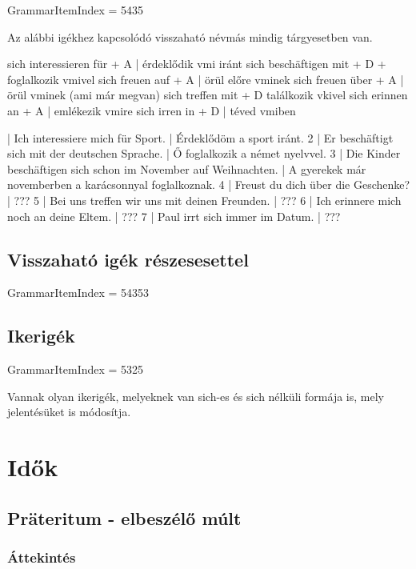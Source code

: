 \documentclass{article}
\newenvironment{desc}{\verbatim}{\endverbatim}
\newenvironment{exmp}{\verbatim}{\endverbatim}
\begin{document}
GrammarItemIndex = 5435

\begin{desc}
Az alábbi igékhez kapcsolódó visszaható névmás mindig tárgyesetben van.

sich interessieren für + A | érdeklődik vmi iránt
sich beschäftigen mit + D + foglalkozik vmivel
sich freuen auf + A | örül előre vminek
sich freuen über + A | örül vminek (ami már megvan)
sich treffen mit + D  találkozik vkivel
sich erinnen an + A | emlékezik vmire
sich irren in + D | téved vmiben
\end{desc}

\begin{exmp}
1 | Ich interessiere mich für Sport. | Érdeklődöm a sport iránt.
2 | Er beschäftigt sich mit der deutschen Sprache. | Ő foglalkozik a német nyelvvel.
3 | Die Kinder beschäftigen sich schon im November auf Weihnachten. | A gyerekek már novemberben a karácsonnyal foglalkoznak.
4 | Freust du dich über die Geschenke? | ???
5 | Bei uns treffen wir uns mit deinen Freunden. | ???
6 | Ich erinnere mich noch an deine Eltem. | ???
7 | Paul irrt sich immer im Datum. | ???
\end{exmp}

\subsection{Visszaható igék részesesettel}

GrammarItemIndex = 54353

\subsection{Ikerigék}

GrammarItemIndex = 5325

\begin{desc}
Vannak olyan ikerigék, melyeknek van sich-es és sich nélküli
formája is, mely jelentésüket is módosítja.
\end{desc}

\section{Idők}

\subsection{Präteritum - elbeszélő múlt}

\subsubsection{Áttekintés}
\end{document}
